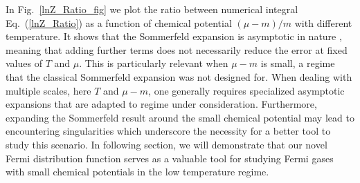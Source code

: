 \documentclass[sn-mathphys,Numbered]{sn-jnl}
\begin{document}
In Fig.~\ref{lnZ_Ratio_fig} we plot the ratio between numerical integral Eq.~(\ref{lnZ_Ratio}) as a function of chemical potential $(\mu-m)/m$ with different temperature. It shows that the Sommerfeld expansion is asymptotic in nature \cite{landau2013statistical}, meaning that adding further terms does not necessarily reduce the error at fixed values of $T$ and $\mu$.  This is particularly relevant when $\mu-m$ is small, a regime that the classical Sommerfeld expansion was not designed for. When dealing with multiple scales, here $T$ and $\mu-m$, one generally requires specialized asymptotic expansions that are adapted to regime under consideration. Furthermore, expanding the Sommerfeld result around the small chemical potential may lead to encountering singularities which underscore the necessity for a better tool to study this scenario. In following section, we will demonstrate that our novel Fermi distribution function serves as a valuable tool for studying Fermi gases with small chemical potentials in the low temperature regime.











\end{document}
